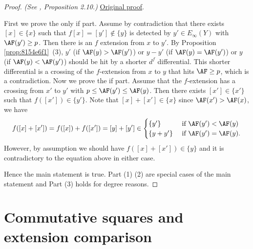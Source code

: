 \begin{proof}
\textit{(See \cite{LWX126}, Proposition 2.10.)} \href{paper/main.tex.html#L418}{Original proof}.

First we prove the only if part. Assume by contradiction that there exists $[x]\in \{x\}$ such that $f[x]=[y']\notin \{y\}$ is detected by $y'\in E_\infty(Y)$ with $\AF(y')\ge p$. Then there is an $f$ extension from $x$ to $y'$. By Proposition \ref{prop:8154e6f1}~(3), $y'$ (if $\AF(y)>\AF(y')$)  or $y-y'$ (if $\AF(y)=\AF(y')$) or $y$ (if $\AF(y)<\AF(y')$) should be hit by a shorter $d^f$ differential. This shorter differential is a crossing of the $f$-extension from $x$ to $y$ that hits $\AF\ge p$, which is a contradiction. Now we prove the if part. Assume that the $f$-extension has a crossing from $x'$ to $y'$ with $p\le \AF(y')\le \AF(y)$. Then there exists $[x']\in \{x'\}$ such that $f([x'])\in \{y'\}$. Note that $[x]+[x']\in \{x\}$ since $\AF(x')>\AF(x)$, we have
    $$f([x]+[x'])=f([x])+f([x'])=[y]+[y']\in\begin{cases}
        \{y'\} & \text{ if } \AF(y')<\AF(y)\\
        \{y+y'\} & \text{ if } \AF(y')=\AF(y).\\
    \end{cases}$$
    However, by assumption we should have $f([x]+[x'])\in \{y\}$ and it is contradictory to the equation above in either case.

    Hence the main statement is true.  Part (1) (2) are special cases of the main statement and Part (3) holds for degree reasons.
\end{proof}

\section{Commutative squares and extension comparison}

